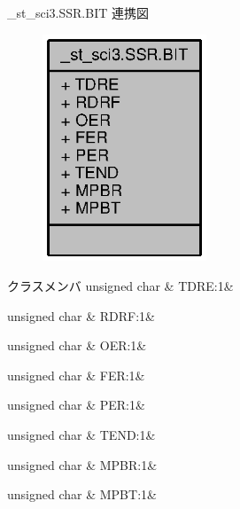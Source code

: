 \+\_\+st\+\_\+sci3.\+S\+S\+R.\+B\+I\+T 連携図
\nopagebreak
\begin{figure}[H]
\begin{center}
\leavevmode
\includegraphics[width=139pt]{dc/db4/struct__st__sci3_8SSR_8BIT__coll__graph}
\end{center}
\end{figure}
\begin{DoxyFields}{クラスメンバ}
unsigned char\label{3694s_8h_a1eac1fe6afb8bd4be047e55fbdc3d0ec}
&
T\+D\+R\+E\+:1&
\\
\hline

unsigned char\label{3694s_8h_a42d1e8ea37c83c47da6dcbedfb3b8571}
&
R\+D\+R\+F\+:1&
\\
\hline

unsigned char\label{3694s_8h_ab655edc9aa463bb21a20c9436d88abea}
&
O\+E\+R\+:1&
\\
\hline

unsigned char\label{3694s_8h_a7ad5ffb2b15eadd78f01ef84235609d2}
&
F\+E\+R\+:1&
\\
\hline

unsigned char\label{3694s_8h_a12ae43e68edf9759c087f2b0db126479}
&
P\+E\+R\+:1&
\\
\hline

unsigned char\label{3694s_8h_a21c0d9578949b414fbab707ce221eb75}
&
T\+E\+N\+D\+:1&
\\
\hline

unsigned char\label{3694s_8h_a6d9c47bd317db7711b6a28fe47572e2b}
&
M\+P\+B\+R\+:1&
\\
\hline

unsigned char\label{3694s_8h_aa1b65519106a68232fd4ba809cd622e1}
&
M\+P\+B\+T\+:1&
\\
\hline

\end{DoxyFields}
\label{union__st__ad_8ADCSR}
